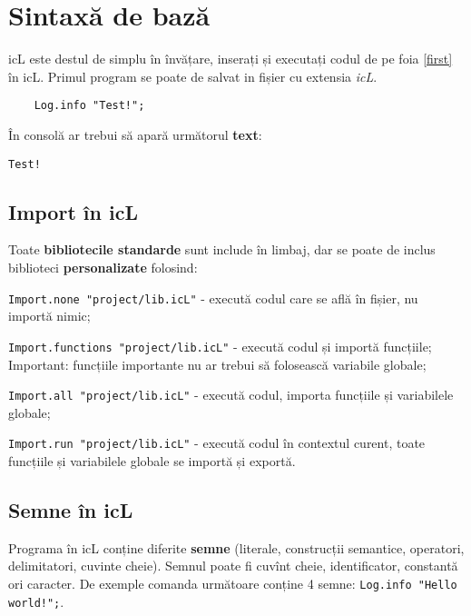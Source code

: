 \section{Sintaxă de bază}

icL este destul de simplu în învățare, inserați și executați codul de pe foia \ref{first} în icL. Primul program se poate de salvat in fișier cu extensia \textit{icL}.

\begin{sourcecode}
    \label{first}
    \begin{verbatim}
    Log.info "Test!";
    \end{verbatim}
\end{sourcecode}

În consolă ar trebui să apară următorul \textbf{text}:

\begin{verbatim}
Test!
\end{verbatim}

\subsection{Import în icL}

Toate \textbf{bibliotecile standarde} sunt include în limbaj, dar se poate de inclus biblioteci \textbf{personalizate} folosind:

\begin{icItems}
\item
	\texttt{Import.none "project/lib.icL"} - execută codul care se află în fișier, nu importă nimic;
\item
	\texttt{Import.functions "project/lib.icL"} - execută codul și importă funcțiile; {\color{red}Important:} funcțiile importante nu ar trebui să folosească variabile globale;
\item
	\texttt{Import.all "project/lib.icL"} -  execută codul, importa funcțiile și variabilele globale;
\item
	\texttt{Import.run "project/lib.icL"} - execută codul în contextul curent, toate funcțiile și variabilele globale se importă și exportă.
\end{icItems}

\subsection{Semne în icL}

Programa în icL conține diferite \textbf{semne} (literale, construcții semantice, operatori, delimitatori, cuvinte cheie). Semnul poate fi cuvînt cheie, identificator, constantă ori caracter. De exemple comanda următoare conține 4 semne: \texttt{Log.info "Hello world!";}.

